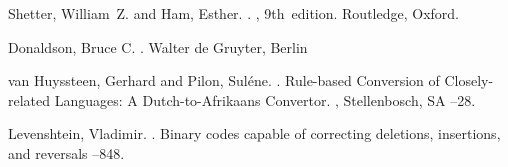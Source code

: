 \documentclass[11pt]{article}
\begin{document}
\begin{thebibliography}{}

Shetter, William~Z. and Ham, Esther.
.
, 9th~edition.
\newblock Routledge, Oxford.

Donaldson, Bruce C.
.
\newblock Walter de Gruyter, Berlin

van Huyssteen, Gerhard and Pilon, Suléne.
. 
\newblock Rule-based Conversion of Closely-related Languages: A Dutch-to-Afrikaans Convertor. 
, Stellenbosch, SA
--28.

Levenshtein, Vladimir.
. 
\newblock Binary codes capable of correcting deletions, insertions, and reversals
--848.


\end{thebibliography}
\end{document}
